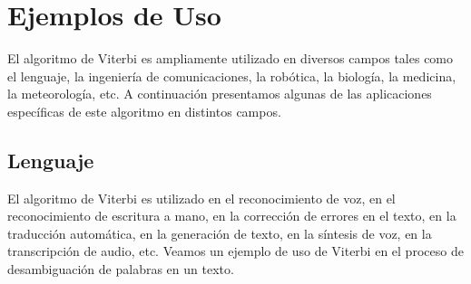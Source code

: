 \documentclass[11pt,openany]{book}
\begin{document}
\chapter{Ejemplos de Uso}
El algoritmo de Viterbi es ampliamente utilizado en diversos campos tales como 
el lenguaje, la ingeniería de comunicaciones, la robótica, la biología, la medicina,
la meteorología, etc. A continuación presentamos algunas de las aplicaciones específicas
de este algoritmo en distintos campos.

\section{Lenguaje}
El algoritmo de Viterbi es utilizado en el reconocimiento de voz, en el reconocimiento
de escritura a mano, en la corrección de errores en el texto, en la traducción automática,
en la generación de texto, en la síntesis de voz, en la transcripción de audio, etc. Veamos
un ejemplo de uso de Viterbi en el proceso de desambiguación de palabras en un texto.
\end{document}
